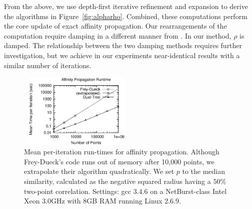 \documentclass{article}
\newcommand{\killspace}{\vspace{-0.08in}}
\newcommand{\vecrho}{\vec{\rho}}
\newcommand{\vecalpha}{\vec{\alpha}}
\begin{document}
\killspace
From the above, we use depth-first iterative refinement and expansion to derive the algorithms in Figure~\ref{fig:alpharho}.
Combined, these computations perform the core update of exact affinity propagation.
Our rearrangements of the computation require damping in a different manner from \cite{affinity}.
In our method, $\rho$ is damped.
The relationship between the two damping methods requires further investigation, but we achieve in our experiments near-identical results with a similar number of iterations.

\begin{figure}[b]
  \begin{minipage}{2.6in}
    \includegraphics[width=2.2in,height=1.4in]{r-speed.ps}
  \end{minipage}
  \begin{minipage}{2.6in}
      \caption{\label{fig:speed}\footnotesize Mean per-iteration run-times for affinity propagation.
	Although Frey-Dueck's code runs out of memory after 10,000 points, we extrapolate their algorithm quadratically.
	We set $p$ to the median similarity, calculated as the negative squared radius having a $50\%$ two-point correlation.
	Settings: gcc 3.4.6 on a NetBurst-class Intel Xeon 3.0GHz with 8GB RAM running Linux 2.6.9.}
  \end{minipage}
  \killspace
\end{figure}
\end{document}
